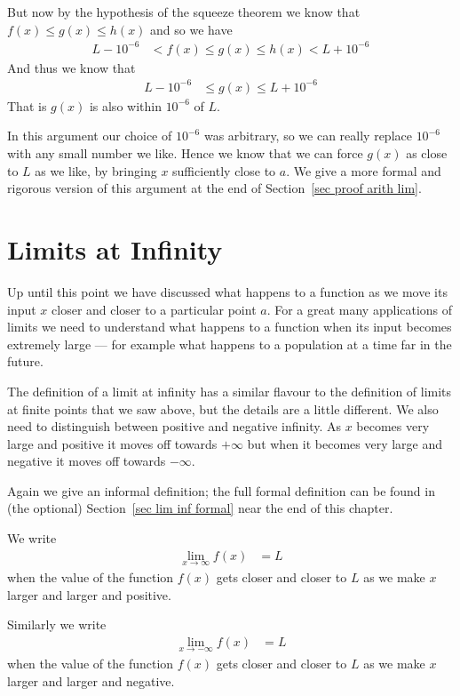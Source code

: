 But now by the hypothesis of the squeeze theorem we know that $f(x) \leq g(x) \leq h(x)$ and so we have
\begin{align*}
L-10^{-6} &< f(x) \leq g(x) \leq h(x) < L+10^{-6}
\end{align*}
And thus we know that
\begin{align}
L-10^{-6} &\leq g(x) \leq L+10^{-6}
\end{align}
That is $g(x)$ is also within $10^{-6}$ of $L$.

In this argument our choice of $10^{-6}$ was arbitrary, so we can really replace $10^{-6}$ with any small number we like.
Hence we know that we can force $g(x)$ as close to $L$ as we like, by bringing $x$ sufficiently close to $a$. We give
a more formal and rigorous version of this argument at the end of Section~\ref{sec proof arith lim}.

\section{Limits at Infinity}
Up until this point we have discussed what happens to a function as we move its input $x$
closer and closer to a particular point $a$. For a great many applications of
limits we need to understand what happens to a function when its input becomes
extremely large --- for example what happens to a population at a time far in
the future.

The definition of a limit at infinity has a similar flavour to the definition of limits at
finite points that we saw above, but the details are a little different. We also
need to distinguish between positive and negative infinity. As $x$ becomes
very large and positive it moves off towards $+\infty$ but when it becomes very
large and negative it moves off towards $-\infty$.


Again we give an informal definition; the full formal definition can be found
in (the optional) Section~\ref{sec lim inf formal} near the end of this chapter.
\begin{defn}
We write
\begin{align*}
\lim_{x \to \infty} f(x) &= L
\end{align*}
when the value of the function $f(x)$ gets closer and closer to $L$ as we make
$x$ larger and larger and positive.

Similarly we write
\begin{align*}
\lim_{x \to -\infty} f(x) &= L
\end{align*}
when the value of the function $f(x)$ gets closer and closer to $L$ as we make
$x$ larger and larger and negative.

\end{defn}

